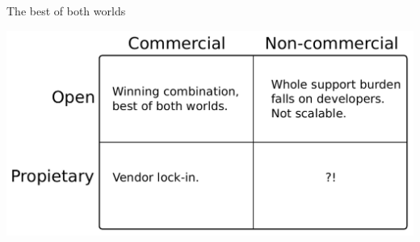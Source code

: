 \documentclass[compress,red]{beamer}
\begin{document}
\begin{frame}{The best of both worlds}
  \begin{center}
   \includegraphics[width=\textwidth]{commercial_and_open.pdf}%
  \end{center}
\end{frame}





\end{document}
